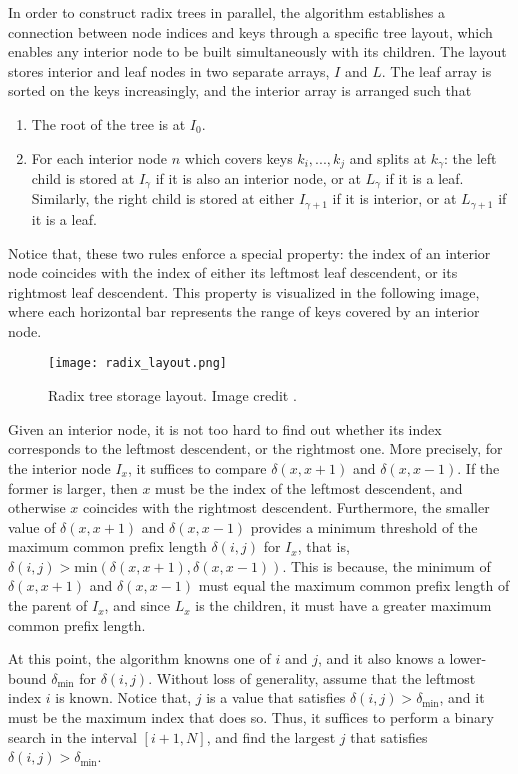 In order to construct radix trees in parallel, the algorithm \cite{bvh_build} establishes a connection between node indices and keys through a specific tree layout, which enables any interior node to be built simultaneously with its children. The layout stores interior and leaf nodes in two separate arrays, $I$ and $L$. The leaf array is sorted on the keys increasingly, and the interior array is arranged such that
\begin{enumerate}
    \item The root of the tree is at $I_0$.
    
    \item For each interior node $n$ which covers keys $k_i,...,k_j$ and splits at $k_\gamma$: the left child is stored at $I_\gamma$ if it is also an interior node, or at $L_\gamma$ if it is a leaf. Similarly, the right child is stored at either $I_{\gamma+1}$ if it is interior, or at $L_{\gamma+1}$ if it is a leaf.
\end{enumerate}

Notice that, these two rules enforce a special property: the index of an interior node coincides with the index of either its leftmost leaf descendent, or its rightmost leaf descendent. This property is visualized in the following image, where each horizontal bar represents the range of keys covered by an interior node.
\begin{figure}[H]
    \centering
    \texttt{[image: radix\_layout.png]}
    \caption{Radix tree storage layout. Image credit \cite{bvh_build}.}
\end{figure}

Given an interior node, it is not too hard to find out whether its index corresponds to the leftmost descendent, or the rightmost one. More precisely, for the interior node $I_{x}$, it suffices to compare $\delta(x,x+1)$ and $\delta(x,x-1)$. If the former is larger, then $x$ must be the index of the leftmost descendent, and otherwise $x$ coincides with the rightmost descendent. Furthermore, the smaller value of $\delta(x,x+1)$ and $\delta(x,x-1)$ provides a minimum threshold of the maximum common prefix length $\delta(i,j)$ for $I_x$, that is, $\delta(i,j)> \text{min}(\delta(x,x+1),\delta(x,x-1))$. This is because, the minimum of $\delta(x,x+1)$ and $\delta(x,x-1)$ must equal the maximum common prefix length of the parent of $I_x$, and since $L_x$ is the children, it must have a greater maximum common prefix length. 

At this point, the algorithm knowns one of $i$ and $j$, and it also knows a lower-bound $\delta_{\text{min}}$ for $\delta(i,j)$. Without loss of generality, assume that the leftmost index $i$ is known. Notice that, $j$ is a value that satisfies $\delta(i,j)>\delta_{\text{min}}$, and it must be the maximum index that does so. Thus, it suffices to perform a binary search in the interval $[i+1,N]$, and find the largest $j$ that satisfies $\delta(i,j)>\delta_{\text{min}}$. 

